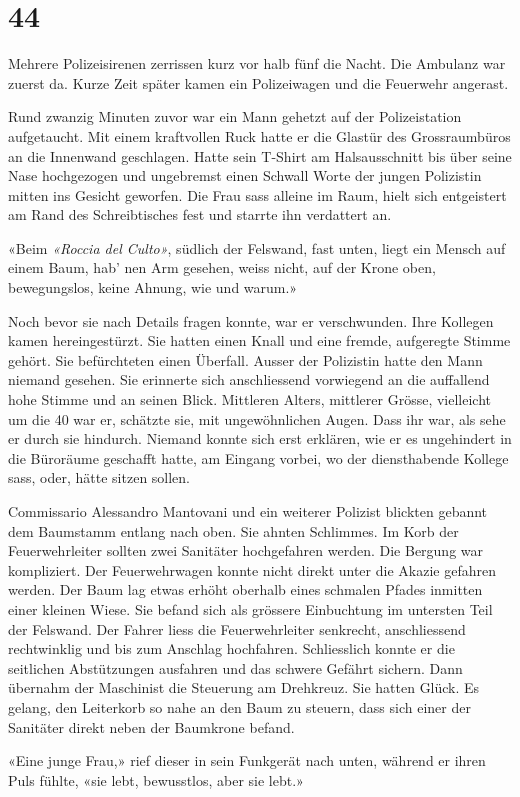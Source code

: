 \chapter{44}



Mehrere Polizeisirenen zerrissen kurz vor halb fünf die Nacht. Die
Ambulanz war zuerst da. Kurze Zeit später kamen ein Polizeiwagen und die
Feuerwehr angerast.

Rund zwanzig Minuten zuvor war ein Mann gehetzt auf der Polizeistation aufgetaucht. 
Mit einem kraftvollen Ruck hatte er die Glastür des Grossraumbüros an
die Innenwand geschlagen. Hatte sein T-Shirt am Halsausschnitt bis über
seine Nase hochgezogen und ungebremst einen Schwall Worte 
der jungen Polizistin mitten ins Gesicht geworfen. Die Frau sass alleine im Raum, 
hielt sich entgeistert am Rand des Schreibtisches fest und starrte ihn
verdattert an.

«Beim \emph{«Roccia del Culto»}, südlich der Felswand, fast unten, liegt
ein Mensch auf einem Baum, hab’ nen Arm gesehen, weiss nicht, auf der
Krone oben, bewegungslos, keine Ahnung, wie und warum.»

Noch bevor sie nach Details fragen konnte, war er verschwunden. Ihre
Kollegen kamen hereingestürzt. Sie hatten einen Knall und eine fremde,
aufgeregte Stimme gehört. Sie befürchteten einen Überfall.
Ausser der Polizistin hatte den Mann niemand gesehen.
Sie erinnerte sich anschliessend vorwiegend an die auffallend hohe
Stimme und an seinen Blick. Mittleren Alters, mittlerer Grösse,
vielleicht um die 40 war er, schätzte sie, mit ungewöhnlichen Augen.
Dass ihr war, als sehe er durch sie hindurch.
Niemand konnte sich erst erklären, wie er es ungehindert in die Büroräume geschafft hatte, 
am Eingang vorbei, wo der diensthabende Kollege sass, oder, hätte sitzen sollen.

Commissario Alessandro Mantovani und ein weiterer Polizist blickten
gebannt dem Baumstamm entlang nach oben. Sie ahnten Schlimmes. Im Korb
der Feuerwehrleiter sollten zwei Sanitäter hochgefahren werden.
Die Bergung war kompliziert. Der Feuerwehrwagen konnte nicht direkt
unter die Akazie gefahren werden. Der Baum lag etwas erhöht oberhalb
eines schmalen Pfades inmitten einer kleinen Wiese. Sie befand
sich als grössere Einbuchtung im untersten Teil der Felswand. Der Fahrer
liess die Feuerwehrleiter senkrecht, anschliessend rechtwinklig und bis
zum Anschlag hochfahren. Schliesslich konnte er die seitlichen
Abstützungen ausfahren und das schwere Gefährt sichern. Dann übernahm
der Maschinist die Steuerung am Drehkreuz. Sie hatten Glück. Es gelang,
den Leiterkorb so nahe an den Baum zu steuern, dass sich einer der Sanitäter direkt neben der Baumkrone befand.

«Eine junge Frau,» rief dieser in sein Funkgerät nach unten,
während er ihren Puls fühlte, «sie lebt, bewusstlos, aber sie lebt.»

